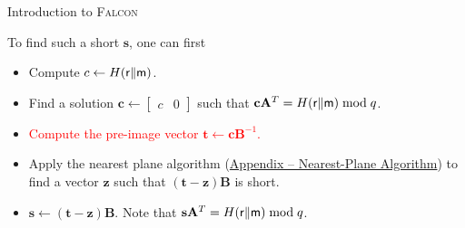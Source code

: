 \begin{frame}{Introduction to \textsc{Falcon}}

To find such a short $\mathbf{s}$, one can first
\pause
\begin{itemize}
    \item Compute $c \gets H({\sf r} \| {\sf m})$.
    \pause
    \item Find a solution $\mathbf{c} \gets \left[
		\begin{array}{c|c} c & 0 \end{array}
		\right]$ such that $\mathbf{c}\mathbf{A}^T = H({\sf r} \| {\sf m}) \bmod q$.
    \pause
    \item \textcolor<7->{red}{Compute the pre-image vector $\mathbf{t} \gets \mathbf{c}\mathbf{B}^{-1}$.}
    \pause
	\item Apply the nearest plane algorithm (\hyperlink{sec:appendix-nearest-plane}{\color{blue}Appendix – Nearest-Plane Algorithm}) to find a vector $\mathbf{z}$ such that $\mathbf{(t-z)B}$ is short.
    \pause
    \item $\mathbf{s} \gets \mathbf{(t-z)B}$. Note that $\mathbf{s}\mathbf{A}^T = H({\sf r} \| {\sf m}) \bmod q$.
\end{itemize}
\end{frame}






